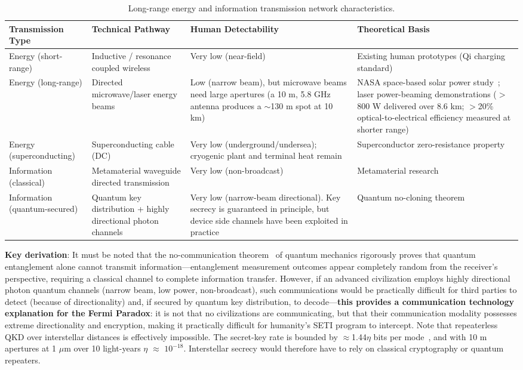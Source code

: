 \documentclass[aps,prd,twocolumn,superscriptaddress,nofootinbib]{revtex4-2}
\begin{document}
\begin{table}[htbp]
\caption{Long-range energy and information transmission network characteristics.}
\label{tab:transmission-network}
\footnotesize
\begin{tabular}{P{0.157\textwidth}P{0.204\textwidth}P{0.268\textwidth}P{0.244\textwidth}}
\toprule
Transmission Type & Technical Pathway & Human Detectability & Theoretical Basis \\
\midrule
Energy (short-range) & Inductive / resonance coupled wireless & Very low (near-field) & Existing human prototypes (Qi charging standard) \\
Energy (long-range) & Directed microwave/laser energy beams & Low (narrow beam), but microwave beams need large apertures (a 10 m, 5.8 GHz antenna produces a ${\sim}$130 m spot at 10 km) & NASA space-based solar power study~\cite{NASA_OTPS2024}; laser power-beaming demonstrations ($>$800 W delivered over 8.6 km; $>$20\% optical-to-electrical efficiency measured at shorter range)~\cite{DARPA2025} \\
Energy (superconducting) & Superconducting cable (DC) & Very low (underground/undersea); cryogenic plant and terminal heat remain & Superconductor zero-resistance property \\
Information (classical) & Metamaterial waveguide directed transmission & Very low (non-broadcast) & Metamaterial research \\
Information (quantum-secured) & Quantum key distribution + highly directional photon channels & Very low (narrow-beam directional). Key secrecy is guaranteed in principle, but device side channels have been exploited in practice~\cite{Lydersen2010} & Quantum no-cloning theorem \\
\bottomrule
\end{tabular}
\end{table}

\textbf{Key derivation}: It must be noted that the no-communication theorem~\cite{Peres2004} of quantum mechanics rigorously proves that quantum entanglement alone cannot transmit information---entanglement measurement outcomes appear completely random from the receiver's perspective, requiring a classical channel to complete information transfer. However, if an advanced civilization employs highly directional photon quantum channels (narrow beam, low power, non-broadcast), such communications would be practically difficult for third parties to detect (because of directionality) and, if secured by quantum key distribution, to decode---\textbf{this provides a communication technology explanation for the Fermi Paradox}: it is not that no civilizations are communicating, but that their communication modality possesses extreme directionality and encryption, making it practically difficult for humanity's SETI program to intercept. Note that repeaterless QKD over interstellar distances is effectively impossible. The secret-key rate is bounded by $\approx$1.44$\eta$ bits per mode~\cite{Pirandola2017}, and with 10 m apertures at 1 $\mu$m over 10 light-years $\eta$ $\approx$ $10^{-18}$. Interstellar secrecy would therefore have to rely on classical cryptography or quantum repeaters.
\end{document}

